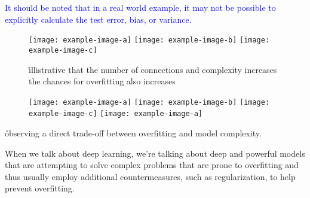 \textcolor{blue}{It should be noted that in a real world example, it may not be possible to explicitly calculate the test error, bias, or variance.}



\begin{figure}[htp]
	\centering
	\texttt{[image: example-image-a]}\hfil
	\texttt{[image: example-image-b]}\hfil
	\texttt{[image: example-image-c]}\hfil
	\caption{ \r{illistrative that the number of connections and complexity increases the chances for overfitting also increases}}
	\label{fig:basics_eval_nodesinhidden}
\end{figure}


\begin{figure}[htp]
	\centering
	\texttt{[image: example-image-a]}\hfil
	\texttt{[image: example-image-b]}\hfil
	\texttt{[image: example-image-c]}\hfil
	\texttt{[image: example-image-a]}\hfil
	\caption{}
	\label{fig:basics_eval_numlayers}
\end{figure}

\r{observing a direct trade-off between overfitting and model complexity.}

\r{When we talk about deep learning, we're talking about deep and powerful models that are attempting to solve complex problems that are prone to overfitting and thus usually employ additional countermeasures, such as regularization, to help prevent overfitting.}


